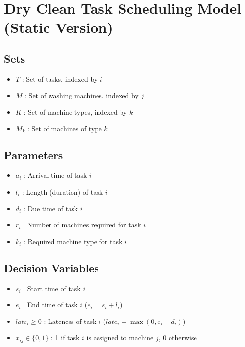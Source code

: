 \documentclass{article}
\begin{document}
\section*{Dry Clean Task Scheduling Model (Static Version)}

\subsection*{Sets}
\begin{itemize}
    \item $T$ : Set of tasks, indexed by $i$
    \item $M$ : Set of washing machines, indexed by $j$
    \item $K$ : Set of machine types, indexed by $k$
    \item $M_k$ : Set of machines of type $k$
\end{itemize}

\subsection*{Parameters}
\begin{itemize}
    \item $a_i$ : Arrival time of task $i$
    \item $l_i$ : Length (duration) of task $i$
    \item $d_i$ : Due time of task $i$
    \item $r_i$ : Number of machines required for task $i$
    \item $k_i$ : Required machine type for task $i$
\end{itemize}

\subsection*{Decision Variables}
\begin{itemize}
    \item $s_i$ : Start time of task $i$
    \item $e_i$ : End time of task $i$ ($e_i = s_i + l_i$)
    \item $late_i \geq 0$ : Lateness of task $i$ ($late_i = \max(0, e_i - d_i)$)
    \item $x_{ij} \in \{0,1\}$ : 1 if task $i$ is assigned to machine $j$, 0 otherwise
\end{itemize}
\end{document}
